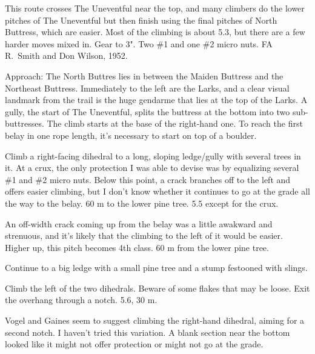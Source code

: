 \documentclass{tahquitz}
\begin{document}



This route crosses The Uneventful near the top, and many climbers do the lower
pitches of The Uneventful but then finish using the final pitches of
North Buttress, which are easier. Most of the climbing is about 5.3,
but there are a few harder moves mixed in. Gear to 3". Two \#1 and one \#2 micro nuts.
FA R.~Smith and Don Wilson, 1952.

Approach: The North Buttres lies
in between the Maiden Buttress and the Northeast Buttress. Immediately
to the left are the Larks, and a clear visual landmark from the trail
is the huge gendarme that lies at the top of the Larks. A gully, the start
of The Uneventful, splits the buttress at the bottom into two sub-buttresses.
The climb starts at the base of the right-hand one.
To reach the first belay in one rope length, it's necessary to start on top of a boulder.

\somespace

 Climb a right-facing dihedral to a long, sloping ledge/gully with
several trees in it. At a crux, the only protection I was able to devise was by
equalizing several \#1 and \#2 micro nuts. Below this point, a crack branches off
to the left and offers easier climbing, but I don't know whether it continues
to go at the grade all the way to the belay. 60 m to the lower pine tree. 5.5 except for
the crux.

 An off-width crack coming up from the belay was a little awakward and strenuous, and
it's likely that the climbing to the left of it would be easier. Higher up, this pitch
becomes 4th class. 60 m from the lower pine tree.

 Continue to a big ledge with a small pine tree and a stump festooned with
slings.

 Climb the left of the two dihedrals. Beware of some flakes that may be loose.
Exit the overhang through a notch. 5.6, 30 m.

 Vogel and Gaines seem to suggest climbing the right-hand dihedral,
aiming for a second notch. I haven't tried this variation.
A blank section near the bottom looked like it might not
offer protection or might not go at the grade.
\end{document}
